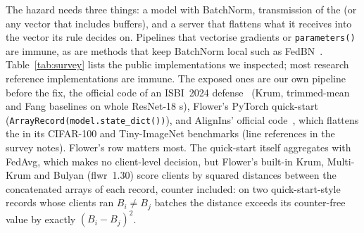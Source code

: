 \documentclass[journal]{IEEEtran}
\begin{document}
The hazard needs three things: a model with BatchNorm, transmission of the \sd{}
(or any vector that includes buffers), and a server that flattens what it receives
into the vector its rule decides on. Pipelines that vectorise gradients or
\texttt{parameters()} are immune, as are methods that keep BatchNorm local such as
FedBN~\cite{li2021fedbn}. Table~\ref{tab:survey} lists the public implementations
we inspected; most research reference implementations are immune. The exposed ones
are our own pipeline before the fix, the official code of an ISBI~2024
defense~\cite{lee2024triplet} (Krum, trimmed-mean and Fang baselines on whole
ResNet-18 \sd{}s), Flower's PyTorch quick-start (\texttt{ArrayRecord(model.state\_dict())}),
and AlignIns' official code~\cite{xu2025alignins}, which flattens the \sd{} in its
CIFAR-100 and Tiny-ImageNet benchmarks (line references in the survey notes).
Flower's row matters most. The quick-start itself
aggregates with FedAvg, which makes no client-level decision, but Flower's built-in
Krum, Multi-Krum and Bulyan (flwr~1.30) score clients by squared distances between
the concatenated arrays of each record, counter included: on two quick-start-style
records whose clients ran $B_i\ne B_j$ batches the distance exceeds its
counter-free value by exactly $(B_i-B_j)^2$.
\end{document}
